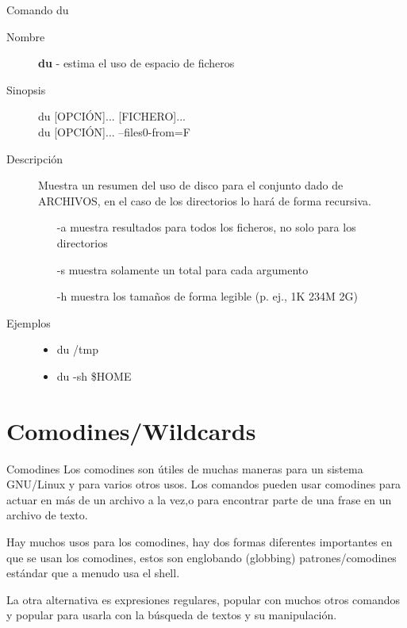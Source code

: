 \begin{frame}[c]{Comando du}
  \begin{description}
    \item[Nombre]
      \textbf{du} - estima el uso de espacio de ficheros

    \vspace{\baselineskip}
    \item[Sinopsis]
      du [OPCIÓN]... [FICHERO]... \\
      du [OPCIÓN]... --files0-from=F
      
    \vspace{\baselineskip}
    \item[Descripción]
      Muestra un resumen del uso de disco para el conjunto dado de ARCHIVOS,
      en el caso de los directorios lo hará de forma recursiva.

      \begin{itemize}
        \item [-a] muestra resultados para todos los ficheros,
          no solo para los directorios
        \item [-s] muestra solamente un total para cada argumento
        \item [-h] muestra los tamaños de forma legible (p. ej., 1K 234M 2G)
      \end{itemize}

    \vspace{\baselineskip}
    \item[Ejemplos]
      \begin{itemize}
        \item du /tmp
        \item du -sh \$HOME
      \end{itemize}
  \end{description}
\end{frame}


\section{Comodines/Wildcards}

\begin{frame}[c]{Comodines}
  Los comodines son útiles de muchas maneras para un sistema GNU/Linux y
  para varios otros usos. Los comandos pueden usar comodines para actuar
  en más de un archivo a la vez,o para encontrar parte de una frase en un
  archivo de texto.

  \vspace{\baselineskip}
  Hay muchos usos para los comodines, hay dos formas diferentes importantes
  en que se usan los comodines, estos son englobando (globbing)
  patrones/comodines estándar que a menudo usa el shell.

  \vspace{\baselineskip}
  La otra alternativa es expresiones regulares, popular con muchos otros
  comandos y popular para usarla con la búsqueda de textos y su
  manipulación.
\end{frame}

